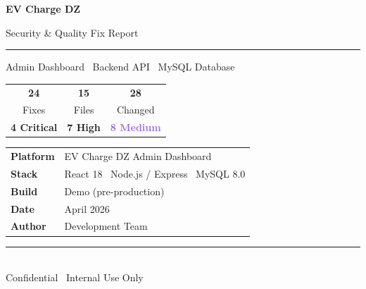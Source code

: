 \documentclass[12pt,a4paper]{report}
\begin{document}
	
	\begin{titlepage}
		\centering
		\vspace*{2.5cm}
		
		{\fontsize{42}{50}\selectfont\bfseries\color{brandblue} EV Charge DZ}
		
		\vspace{0.5cm}
		{\LARGE Security \& Quality Fix Report}
		
		\vspace{0.3cm}
		\textcolor{midblue}{\rule{0.6\linewidth}{1pt}}
		
		\vspace{0.5cm}
		{\large\color{labelgray} Admin Dashboard \textbullet\ Backend API \textbullet\ MySQL Database}
		
		\vspace{2cm}
		
		\begin{tcolorbox}[
			colback  = lightblue,
			colframe = midblue,
			arc      = 6pt,
			width    = 0.72\linewidth,
			left     = 14pt, right = 14pt, top = 12pt, bottom = 12pt,
			]
			\centering
			\begin{tabular}{ccc}
				\textbf{\fontsize{32}{36}\selectfont\color{brandblue}24}  &
				\textbf{\fontsize{32}{36}\selectfont\color{brandblue}15}  &
				\textbf{\fontsize{32}{36}\selectfont\color{brandblue}28}  \\[2pt]
				\color{labelgray}Fixes & \color{labelgray}Files & \color{labelgray}Changed
				\\[10pt]
				\textcolor{criticalred}{\large\textbf{4 Critical}} &
				\textcolor{highorange}{\large\textbf{7 High}} &
				\textcolor{mediumpurple}{\large\textbf{8 Medium}}
			\end{tabular}
		\end{tcolorbox}
		
		\vspace{2cm}
		
		\begin{tabular}{ll}
			\textbf{Platform}  & EV Charge DZ Admin Dashboard \\[4pt]
			\textbf{Stack}     & React 18 \textbullet\ Node.js / Express \textbullet\ MySQL 8.0 \\[4pt]
			\textbf{Build}     & Demo (pre-production) \\[4pt]
			\textbf{Date}      & April 2026 \\[4pt]
			\textbf{Author}    & Development Team \\
		\end{tabular}
		
		\vfill
		\textcolor{midblue}{\rule{0.6\linewidth}{0.5pt}}\\[6pt]
		{\small\color{labelgray} Confidential \textbullet\ Internal Use Only}
	\end{titlepage}
	
\end{document}
